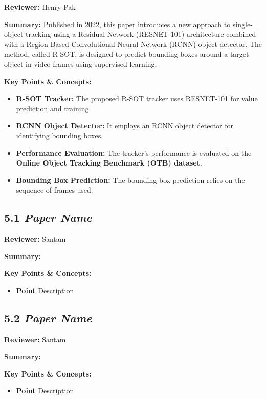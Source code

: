 \documentclass{article}
\begin{document}
\hspace*{\parindent}\textbf{Reviewer:} Henry Pak

\vspace{0.3cm}

\textbf{Summary:} Published in 2022, this paper introduces a new approach to single-object tracking using a Residual Network (RESNET-101) architecture combined with a Region Based Convolutional Neural Network (RCNN) object detector. The method, called R-SOT, is designed to predict bounding boxes around a target object in video frames using supervised learning.

\vspace{0.3cm}

\textbf{Key Points \& Concepts:}
\begin{itemize}
  \item \textbf{R-SOT Tracker:} The proposed R-SOT tracker uses RESNET-101 for value prediction and training.
  \item \textbf{RCNN Object Detector:} It employs an RCNN object detector for identifying bounding boxes.
  \item \textbf{Performance Evaluation:} The tracker's performance is evaluated on the \textbf{Online Object Tracking Benchmark (OTB) dataset}.
  \item \textbf{Bounding Box Prediction:} The bounding box prediction relies on the sequence of frames used.
\end{itemize}

\subsection*{5.1 \textit{Paper Name}}

\hspace*{\parindent}\textbf{Reviewer:} Santam

\vspace{0.3cm}

\textbf{Summary:}

\vspace{0.3cm}

\textbf{Key Points \& Concepts:}
\begin{itemize}
  \item \textbf{Point} Description
\end{itemize}

\subsection*{5.2 \textit{Paper Name}}

\hspace*{\parindent}\textbf{Reviewer:} Santam

\vspace{0.3cm}

\textbf{Summary:}

\vspace{0.3cm}

\textbf{Key Points \& Concepts:}
\begin{itemize}
  \item \textbf{Point} Description
\end{itemize}
\end{document}
